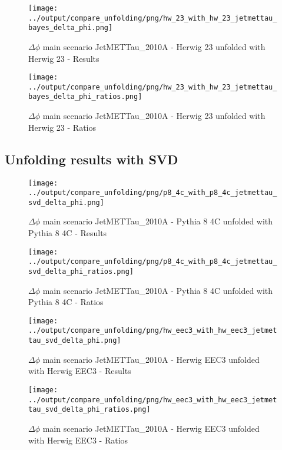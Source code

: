 \documentclass[11pt]{book}
\begin{document}
\begin{figure}[ht]
\centering
\texttt{[image: ../output/compare\_unfolding/png/hw\_23\_with\_hw\_23\_jetmettau\_bayes\_delta\_phi.png]}
\caption{$\Delta\phi$ main scenario JetMETTau\_2010A - Herwig 23 unfolded with Herwig 23 - Results}
\label{hw_23_hw_23_jetmettau_delta_phi_a}
\end{figure}

\begin{figure}[ht]
\centering
\texttt{[image: ../output/compare\_unfolding/png/hw\_23\_with\_hw\_23\_jetmettau\_bayes\_delta\_phi\_ratios.png]}
\caption{$\Delta\phi$ main scenario JetMETTau\_2010A - Herwig 23 unfolded with Herwig 23 - Ratios}
\label{hw_23_jetmettau_delta_phi_b}
\end{figure}

\clearpage
\subsection{Unfolding results with SVD}

\begin{figure}[ht]
\centering
\texttt{[image: ../output/compare\_unfolding/png/p8\_4c\_with\_p8\_4c\_jetmettau\_svd\_delta\_phi.png]}
\caption{$\Delta\phi$ main scenario JetMETTau\_2010A - Pythia 8 4C unfolded with Pythia 8 4C - Results}
\label{p8_p8_jetmettau_svd_delta_phi_a}
\end{figure}

\begin{figure}[ht]
\centering
\texttt{[image: ../output/compare\_unfolding/png/p8\_4c\_with\_p8\_4c\_jetmettau\_svd\_delta\_phi\_ratios.png]}
\caption{$\Delta\phi$ main scenario JetMETTau\_2010A - Pythia 8 4C unfolded with Pythia 8 4C - Ratios}
\label{p8_p8_jetmettau_svd_delta_phi_b}
\end{figure}

\begin{figure}[ht]
\centering
\texttt{[image: ../output/compare\_unfolding/png/hw\_eec3\_with\_hw\_eec3\_jetmettau\_svd\_delta\_phi.png]}
\caption{$\Delta\phi$ main scenario JetMETTau\_2010A - Herwig EEC3 unfolded with Herwig EEC3 - Results}
\label{hw_eec3_hw_eec3_jetmettau_svd_delta_phi_a}
\end{figure}

\begin{figure}[ht]
\centering
\texttt{[image: ../output/compare\_unfolding/png/hw\_eec3\_with\_hw\_eec3\_jetmettau\_svd\_delta\_phi\_ratios.png]}
\caption{$\Delta\phi$ main scenario JetMETTau\_2010A - Herwig EEC3 unfolded with Herwig EEC3 - Ratios}
\label{hw_eec3_jetmettau_svd_delta_phi_b}
\end{figure}
\end{document}
